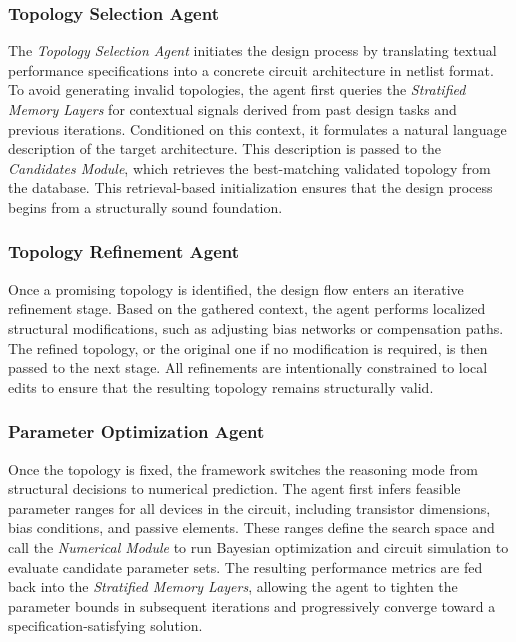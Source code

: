 \subsubsection{Topology Selection Agent}




The \emph{Topology Selection Agent} initiates the design process by translating textual performance specifications into a concrete circuit architecture in netlist format. To avoid generating invalid topologies, the agent first queries the \emph{Stratified Memory Layers} for contextual signals derived from past design tasks and previous iterations. Conditioned on this context, it formulates a natural language description of the target architecture. This description is passed to the \emph{Candidates Module}, which retrieves the best-matching validated topology from the database. This retrieval-based initialization ensures that the design process begins from a structurally sound foundation.


\subsubsection{Topology Refinement Agent}


Once a promising topology is identified, the design flow enters an iterative refinement stage. Based on the gathered context, the agent performs localized structural modifications, such as adjusting bias networks or compensation paths. The refined topology, or the original one if no modification is required, is then passed to the next stage. All refinements are intentionally constrained to local edits to ensure that the resulting topology remains structurally valid.


\subsubsection{Parameter Optimization Agent}



Once the topology is fixed, the framework switches the reasoning mode from structural decisions to numerical prediction. The agent first infers feasible parameter ranges for all devices in the circuit, including transistor dimensions, bias conditions, and passive elements. These ranges define the search space and call the \emph{Numerical Module } to run Bayesian optimization and circuit simulation to evaluate candidate parameter sets. The resulting performance metrics are fed back into the \emph{Stratified Memory Layers}, allowing the agent to tighten the parameter bounds in subsequent iterations and progressively converge toward a specification-satisfying solution.


